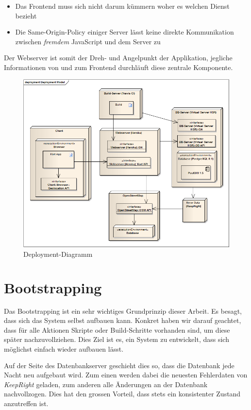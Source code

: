 \begin{itemize}
\item Das Frontend muss sich nicht darum kümmern woher es welchen Dienst bezieht
\item Die Same-Origin-Policy\cite{sop} einiger Server lässt keine direkte Kommunikation zwischen \emph{fremdem} JavaScript und dem Server zu
\end{itemize}

Der Webserver ist somit der Dreh- und Angelpunkt der Applikation, jegliche Informationen von und zum Frontend durchläuft diese zentrale Komponente.

\begin{figure}[H]
	\centering
	\includegraphics[width=\textwidth]{images/uml/deployment_diagram}
	\caption{Deployment-Diagramm}
	\label{deplyoyment-diagram}
\end{figure}

\section{Bootstrapping}
Das \gls{Bootstrapping} ist ein sehr wichtiges Grundprinzip dieser Arbeit.
Es besagt, dass sich das System selbst aufbauen kann.
Konkret haben wir darauf geachtet, dass für alle Aktionen Skripte oder Build-Schritte vorhanden sind, um diese später nachzuvollziehen.
Dies Ziel ist es, ein System zu entwickelt, dass sich möglichst einfach wieder aufbauen lässt.

Auf der Seite des Datenbankserver geschieht dies so, dass die Datenbank jede Nacht neu aufgebaut wird.
Zum einen werden dabei die neuesten Fehlerdaten von \emph{KeepRight} geladen, zum anderen alle Änderungen an der Datenbank nachvollzogen.
Dies hat den grossen Vorteil, dass stets ein konsistenter Zustand anzutreffen ist.

